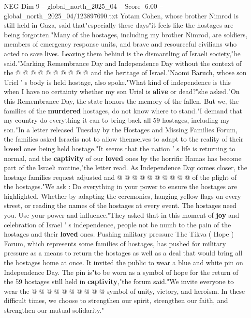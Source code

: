 \begin{textsample}{NEG Dim 9 – global\_north\_2025\_04 – Score -6.00 – global\_north\_2025\_04/123897690.txt}
Yotam Cohen, whose brother Nimrod is still held in Gaza, said that"especially these days"it feels like the hostages are being forgotten."Many of the hostages, including my brother Nimrod, are soldiers, members of emergency response units, and brave and resourceful civilians who acted to save lives.
Leaving them behind is the dismantling of Israeli society,"he said."Marking Remembrance Day and Independence Day without the context of the @ @ @ @ @ @ @ @ @ @ and the heritage of Israel."Naomi Baruch, whose son Uriel ' s body is held hostage, also spoke."What kind of independence is this when I have no certainty whether my son Uriel is \textbf{alive} or dead?"she asked."On this Remembrance Day, the state honors the memory of the fallen.
But we, the families of the \textbf{murdered} hostages, do not know where to stand."I demand that my country do everything it can to bring back all 59 hostages, including my son."In a letter released Tuesday by the Hostages and Missing Families Forum, the families asked Israelis not to allow themselves to adapt to the reality of their \textbf{loved} ones being held hostage."It seems that the nation ' s life is returning to normal, and the \textbf{captivity} of our \textbf{loved} ones by the horrific Hamas has become part of the Israeli routine,"the letter read.
As Independence Day comes closer, the hostage families request adjusted and @ @ @ @ @ @ @ @ @ @ of the plight of the hostages."We ask : Do everything in your power to ensure the hostages are highlighted.
Whether by adapting the ceremonies, hanging yellow flags on every street, or reading the names of the hostages at every event.
The hostages need you.
Use your power and influence."They asked that in this moment of \textbf{joy} and celebration of Israel ' s independence, people not be numb to the pain of the hostages and their \textbf{loved} ones.
Pushing military pressure The Tikva ( Hope ) Forum, which represents some families of hostages, has pushed for military pressure as a means to return the hostages as well as a deal that would bring all the hostages home at once.
It invited the public to wear a blue and white pin on Independence Day.
The pin is"to be worn as a symbol of hope for the return of the 59 hostages still held in \textbf{captivity},"the forum said."We invite everyone to wear the @ @ @ @ @ @ @ @ @ @ symbol of unity, victory, and heroism.
In these difficult times, we choose to strengthen our spirit, strengthen our faith, and strengthen our mutual solidarity."

\end{textsample}
